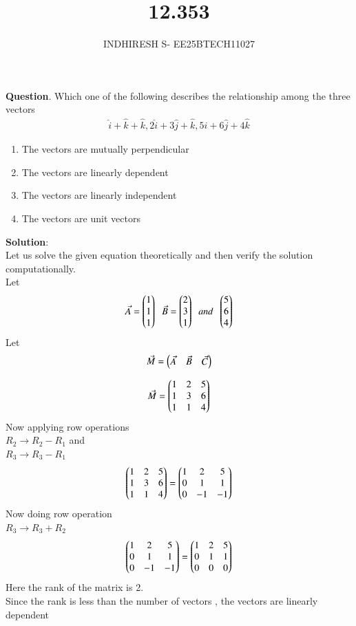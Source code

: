 \documentclass[journal]{IEEEtran}
\theoremstyle{remark}
\begin{document}

\onecolumn

\title{12.353}
\author{INDHIRESH S- EE25BTECH11027}
\maketitle


\renewcommand{\thefigure}{\theenumi}
\renewcommand{\thetable}{\theenumi}

\textbf{Question}. Which one of the following describes the relationship among the three vectors
\begin{align*}
    \hat{i}+\hat{k}+\hat{k},2\hat{i}+3\hat{j}+\hat{k},5\hat{i}+6\hat{j}+4\hat{k}
\end{align*}
\begin{enumerate}
    \item The vectors are mutually perpendicular
    \item The vectors are linearly dependent
    \item The vectors are linearly independent
    \item The vectors are unit vectors
\end{enumerate}
\textbf{Solution}:\\
Let us solve the given equation theoretically and then verify the solution computationally.\\
Let
\begin{align}
\Vec{A}=\begin{pmatrix}1\\1\\1\end{pmatrix}\;\;\Vec{B}=\begin{pmatrix}2\\3\\1\end{pmatrix}\;\;and\;\;\begin{pmatrix}5\\6\\4\end{pmatrix}
\end{align}
Let 
\begin{align}
   \Vec{M}=\begin{pmatrix}\Vec{A}&\Vec{B}&\Vec{C}\end{pmatrix}
\end{align}

\begin{align}
    \Vec{M}=\begin{pmatrix}1&2&5\\1&3&6\\1&1&4\end{pmatrix}
\end{align}
Now applying row operations\\
$R_2\longrightarrow R_2-R_1$ and \\
$R_3\longrightarrow R_3-R_1$
\begin{align}
   \begin{pmatrix}1&2&5\\1&3&6\\1&1&4\end{pmatrix}=\begin{pmatrix}1&2&5\\0&1&1\\0&-1&-1\end{pmatrix}
\end{align}
Now doing row operation\\
$R_3\longrightarrow R_3+R_2$
\begin{align}
   \begin{pmatrix}1&2&5\\0&1&1\\0&-1&-1\end{pmatrix}= \begin{pmatrix}1&2&5\\0&1&1\\0&0&0\end{pmatrix}
\end{align}
Here the rank of the matrix is 2.\\
Since the rank is less than the number of vectors , the vectors are linearly dependent
\end{document}
